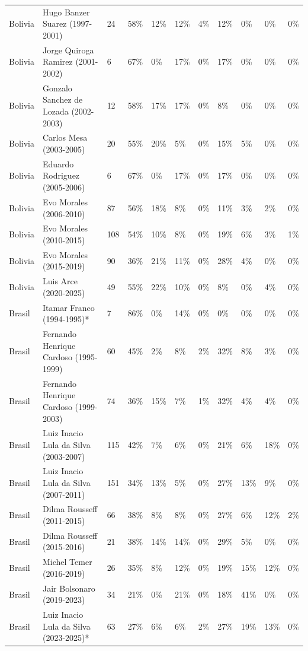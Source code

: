 \documentclass[11pt,a4paper]{article}
\begin{document}
\begin{longtable}{lllllllllll}
  Bolivia & Hugo Banzer Suarez (1997-2001) & 24 & 58\% & 12\% & 12\% & 4\% & 12\% & 0\% & 0\% & 0\% \\ 
  Bolivia & Jorge Quiroga Ramirez (2001-2002) & 6 & 67\% & 0\% & 17\% & 0\% & 17\% & 0\% & 0\% & 0\% \\ 
  Bolivia & Gonzalo Sanchez de Lozada (2002-2003) & 12 & 58\% & 17\% & 17\% & 0\% & 8\% & 0\% & 0\% & 0\% \\ 
  Bolivia & Carlos Mesa (2003-2005) & 20 & 55\% & 20\% & 5\% & 0\% & 15\% & 5\% & 0\% & 0\% \\ 
  Bolivia & Eduardo Rodriguez (2005-2006) & 6 & 67\% & 0\% & 17\% & 0\% & 17\% & 0\% & 0\% & 0\% \\ 
  Bolivia & Evo Morales (2006-2010) & 87 & 56\% & 18\% & 8\% & 0\% & 11\% & 3\% & 2\% & 0\% \\ 
  Bolivia & Evo Morales (2010-2015) & 108 & 54\% & 10\% & 8\% & 0\% & 19\% & 6\% & 3\% & 1\% \\ 
  Bolivia & Evo Morales (2015-2019) & 90 & 36\% & 21\% & 11\% & 0\% & 28\% & 4\% & 0\% & 0\% \\ 
  Bolivia & Luis Arce (2020-2025) & 49 & 55\% & 22\% & 10\% & 0\% & 8\% & 0\% & 4\% & 0\% \\ 
  Brasil & Itamar Franco (1994-1995)* & 7 & 86\% & 0\% & 14\% & 0\% & 0\% & 0\% & 0\% & 0\% \\ 
  Brasil & Fernando Henrique Cardoso (1995-1999) & 60 & 45\% & 2\% & 8\% & 2\% & 32\% & 8\% & 3\% & 0\% \\ 
  Brasil & Fernando Henrique Cardoso (1999-2003) & 74 & 36\% & 15\% & 7\% & 1\% & 32\% & 4\% & 4\% & 0\% \\ 
  Brasil & Luiz Inacio Lula da Silva (2003-2007) & 115 & 42\% & 7\% & 6\% & 0\% & 21\% & 6\% & 18\% & 0\% \\ 
  Brasil & Luiz Inacio Lula da Silva (2007-2011) & 151 & 34\% & 13\% & 5\% & 0\% & 27\% & 13\% & 9\% & 0\% \\ 
  Brasil & Dilma Rousseff (2011-2015) & 66 & 38\% & 8\% & 8\% & 0\% & 27\% & 6\% & 12\% & 2\% \\ 
  Brasil & Dilma Rousseff (2015-2016) & 21 & 38\% & 14\% & 14\% & 0\% & 29\% & 5\% & 0\% & 0\% \\ 
  Brasil & Michel Temer (2016-2019) & 26 & 35\% & 8\% & 12\% & 0\% & 19\% & 15\% & 12\% & 0\% \\ 
  Brasil & Jair Bolsonaro (2019-2023) & 34 & 21\% & 0\% & 21\% & 0\% & 18\% & 41\% & 0\% & 0\% \\ 
  Brasil & Luiz Inacio Lula da Silva (2023-2025)* & 63 & 27\% & 6\% & 6\% & 2\% & 27\% & 19\% & 13\% & 0\% \\ 

\end{longtable}
\end{document}

